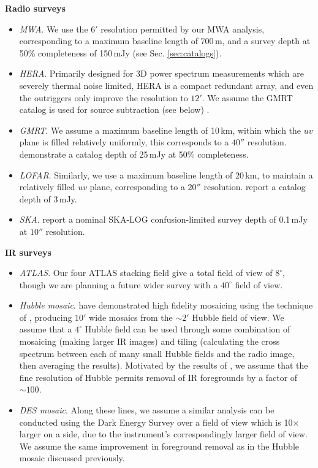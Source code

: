 \documentclass[numberedappendix]{emulateapj}
\begin{document}
\noindent\textbf{Radio surveys}
\begin{itemize}
\item \textit{MWA}. We use the $6'$ resolution permitted by our MWA analysis, corresponding to a maximum baseline length of 700\,m, and a survey depth at 50\% completeness of 150\,mJy (see Sec. \ref{sec:catalogs}).
\item \textit{HERA}. Primarily designed for 3D power spectrum measurements which are severely thermal noise limited, HERA is a compact redundant array, and even the outriggers only improve the resolution to $12'$. We assume the GMRT catalog is used for source subtraction (see below) \citet{deboer16}.
\item \textit{GMRT}. We assume a maximum baseline length of 10\,km, within which the $uv$ plane is filled relatively uniformly, this corresponds to a $40''$ resolution. \citet{intema17} demonstrate a catalog depth of 25\,mJy at 50\% completeness.
\item \textit{LOFAR}. Similarly, we use a maximum baseline length of 20\,km, to maintain a relatively filled $uv$ plane, corresponding to a $20''$ resolution. \citet{lofareorpaper} report a catalog depth of 3\,mJy. 
\item \textit{SKA}. \citet{prandoni15} report a nominal SKA-LOG confusion-limited survey depth of 0.1\,mJy at $10''$ resolution.
\end{itemize}

\noindent\textbf{IR surveys}
\begin{itemize}
\item \textit{ATLAS}. Our four ATLAS stacking field give a total field of view of $8^\circ$, though we are planning a future wider survey with a $40^\circ$ field of view. 
\item \textit{Hubble mosaic}. \citet{mw15} have demonstrated high fidelity mosaicing using the technique of \citet{fixen00}, producing $10'$ wide mosaics from the $\sim2'$ Hubble field of view. We assume that a $4^\circ$ Hubble field can be used through some combination of mosaicing (making larger IR images) and tiling (calculating the cross spectrum between each of many small Hubble fields and the radio image, then averaging the results). Motivated by the results of \citet{mw15}, we assume that the fine resolution of Hubble permits removal of IR foregrounds by a factor of $\sim100$.
\item \textit{DES mosaic}. Along these lines, we assume a similar analysis can be conducted using the Dark Energy Survey\citet{des16} over a field of view which is 10$\times$ larger on a side, due to the instrument's correspondingly larger field of view. We assume the same improvement in foreground removal as in the Hubble mosaic discussed previously.
\end{itemize}
\end{document}

